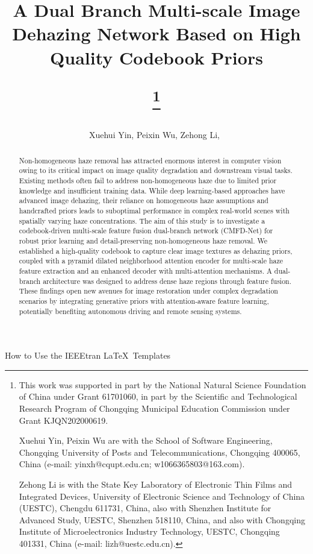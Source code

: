 \documentclass[journal]{IEEEtran}
\begin{document}
\title{A Dual Branch Multi-scale Image Dehazing Network Based on High Quality Codebook Priors
	\author{Xuehui Yin, Peixin Wu, Zehong Li,~}
	\thanks{This work was supported in part by the National Natural Science Foundation of China under Grant 61701060, in part by the Scientific and Technological Research Program of Chongqing Municipal Education Commission under Grant KJQN202000619.

		Xuehui Yin, Peixin Wu are with the School of Software Engineering, Chongqing University of Posts and Telecommunications, Chongqing 400065, China (e-mail: yinxh@cqupt.edu.cn; w1066365803@163.com).

		Zehong Li is with the State Key Laboratory of Electronic Thin Films and Integrated Devices, University of Electronic Science and Technology of China (UESTC), Chengdu 611731, China, also with Shenzhen Institute for Advanced Study, UESTC, Shenzhen 518110, China, and also with Chongqing Institute of Microelectronics Industry Technology, UESTC, Chongqing 401331, China (e-mail: lizh@uestc.edu.cn).
	}}

%
{How to Use the IEEEtran \LaTeX \ Templates}

\maketitle

\begin{abstract}
	Non-homogeneous haze removal has attracted enormous interest in computer vision owing to its critical impact on image quality degradation and downstream visual tasks. Existing methods often fail to address non-homogeneous haze due to limited prior knowledge and insufficient training data. While deep learning-based approaches have advanced image dehazing, their reliance on homogeneous haze assumptions and handcrafted priors leads to suboptimal performance in complex real-world scenes with spatially varying haze concentrations. The aim of this study is to investigate a codebook-driven multi-scale feature fusion dual-branch network (CMFD-Net) for robust prior learning and detail-preserving non-homogeneous haze removal. We established a high-quality codebook to capture clear image textures as dehazing priors, coupled with a pyramid dilated neighborhood attention encoder for multi-scale haze feature extraction and an enhanced decoder with multi-attention mechanisms. A dual-branch architecture was designed to address dense haze regions through feature fusion. These findings open new avenues for image restoration under complex degradation scenarios by integrating generative priors with attention-aware feature learning, potentially benefiting autonomous driving and remote sensing systems.
\end{abstract}
\end{document}
